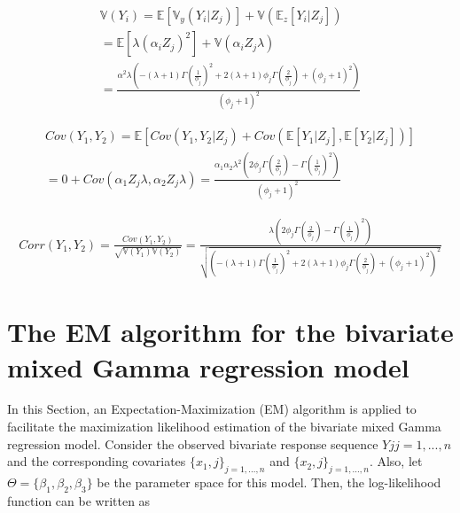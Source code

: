 \documentclass[12pt]{article}%
\theoremstyle{definition}
\theoremstyle{remark}
\begin{document}
\begin{align} \nonumber \label{var}
	\mathbb{V}(Y_i)=\mathbb{E}[\mathbb{V}_y(Y_i|Z_j)]+\mathbb{V}(\mathbb{E}_z[Y_i|Z_j])\\
	=\mathbb{E}[\lambda(\alpha_{i}Z_j)^2]+\mathbb{V}(\alpha_{i}Z_j\lambda)\\
	=\frac{\alpha ^2 \lambda  \left(-(\lambda +1) \Gamma \left(\frac{1}{\phi_j }\right)^2+2 (\lambda +1) \phi_j  \Gamma \left(\frac{2}{\phi_j }\right)+(\phi_j +1)^2\right)}{(\phi_j +1)^2}
\end{align}

\begin{align}\nonumber \label{var}
	Cov(Y_1,Y_2)=\mathbb{E}[Cov(Y_1,Y_2|Z_j)+Cov(\mathbb{E}[Y_1|Z_j],\mathbb{E}[Y_2|Z_j])]\\
	=0+Cov(\alpha_{1}Z_j\lambda,\alpha_{2}Z_j\lambda)=\frac{\alpha _1 \alpha _2 \lambda ^2 \left(2 \phi_j  \Gamma \left(\frac{2}{\phi_j }\right)-\Gamma \left(\frac{1}{\phi_j }\right)^2\right)}{(\phi_j +1)^2}
\end{align}

\begin{align}
	Corr(Y_1,Y_2)=\frac{Cov(Y_1,Y_2)}{\sqrt{\mathbb{V}(Y_1)\mathbb{V}(Y_2)}}=\frac{\lambda  \left(2 \phi_j  \Gamma \left(\frac{2}{\phi_j }\right)-\Gamma \left(\frac{1}{\phi_j }\right)^2\right)}{\sqrt{\left(-(\lambda +1) \Gamma \left(\frac{1}{\phi_j }\right)^2+2 (\lambda +1) \phi_j  \Gamma \left(\frac{2}{\phi_j }\right)+(\phi_j +1)^2\right)^2}}
\end{align}
\pagebreak





\section{ The EM algorithm for the bivariate mixed Gamma regression model} 

In this Section, an Expectation-Maximization (EM) algorithm is applied to facilitate the 
maximization likelihood estimation of the bivariate mixed Gamma regression model. 
Consider the observed bivariate response sequence ${Yj}j=1,...,n$ and the corresponding 
covariates $\{x_1,j\}_{j=1,...,n}$ and $\{x_2,j\}_{j=1,...,n}.$ Also, let $\Theta= \{\beta_1
	, \beta_2
	, \beta_3\}$ be the parameter space 
for this model. Then, the log-likelihood function can be written as 
\end{document}
